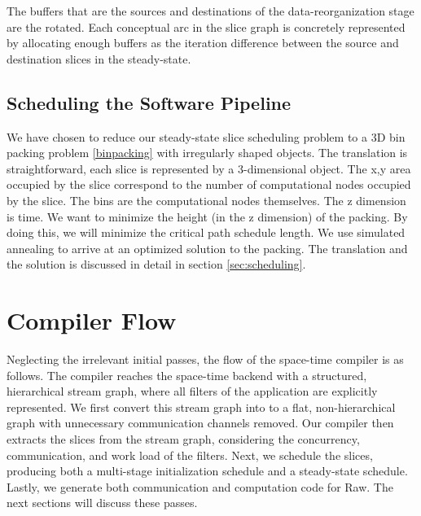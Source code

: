 The buffers that are the sources and destinations of the
data-reorganization stage are the rotated.  Each conceptual arc in the
slice graph is concretely represented by allocating enough buffers as
the iteration difference between the source and destination slices in
the steady-state.

\subsection{Scheduling the Software Pipeline}
We have chosen to reduce our steady-state slice scheduling problem to
a 3D bin packing problem \ref{binpacking} with irregularly shaped
objects.  The translation is straightforward, each slice is
represented by a 3-dimensional object.  The x,y area occupied by
the slice correspond to the number of computational nodes occupied by
the slice.  The bins are the computational nodes themselves.  The z
dimension is time.  We want to minimize the height (in the z
dimension) of the packing.  By doing this, we will minimize the
critical path schedule length.  We use simulated annealing to arrive
at an optimized solution to the packing.  The translation and the
solution is discussed in detail in section \ref{sec:scheduling}.

\section{Compiler Flow}
Neglecting the irrelevant initial passes, the flow of the space-time
compiler is as follows.  The compiler reaches the space-time backend
with a structured, hierarchical stream graph, where all filters of the
application are explicitly represented.  We first convert this stream
graph into to a flat, non-hierarchical graph with unnecessary
communication channels removed.  Our compiler then extracts the
slices from the stream graph, considering the concurrency,
communication, and work load of the filters.
Next, we schedule the slices, producing both a multi-stage
initialization schedule and a steady-state schedule.  Lastly, we
generate both communication and computation code for Raw.  The next
sections will discuss these passes.